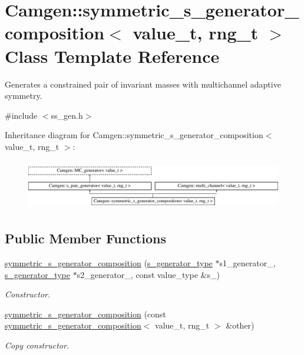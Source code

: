 \hypertarget{a00533}{}\section{Camgen\+:\+:symmetric\+\_\+s\+\_\+generator\+\_\+composition$<$ value\+\_\+t, rng\+\_\+t $>$ Class Template Reference}
\label{a00533}


Generates a constrained pair of invariant masses with multichannel adaptive symmetry.  




{\ttfamily \#include $<$ss\+\_\+gen.\+h$>$}

Inheritance diagram for Camgen\+:\+:symmetric\+\_\+s\+\_\+generator\+\_\+composition$<$ value\+\_\+t, rng\+\_\+t $>$\+:\begin{figure}[H]
\begin{center}
\leavevmode
\includegraphics[height=2.216359cm]{a00533}
\end{center}
\end{figure}
\subsection*{Public Member Functions}
\begin{DoxyCompactItemize}
\item 
\hypertarget{a00533_ab86ac42c4a72e297e248e5801c8919d5}{}\hyperlink{a00533_ab86ac42c4a72e297e248e5801c8919d5}{symmetric\+\_\+s\+\_\+generator\+\_\+composition} (\hyperlink{a00577}{s\+\_\+generator\+\_\+type} $\ast$s1\+\_\+generator\+\_\+, \hyperlink{a00577}{s\+\_\+generator\+\_\+type} $\ast$s2\+\_\+generator\+\_\+, const value\+\_\+type \&s\+\_\+)\label{a00533_ab86ac42c4a72e297e248e5801c8919d5}

\begin{DoxyCompactList}\small\item\em Constructor. \end{DoxyCompactList}\item 
\hypertarget{a00533_a9305a64564b0f6b4a496fd495301e0a4}{}\hyperlink{a00533_a9305a64564b0f6b4a496fd495301e0a4}{symmetric\+\_\+s\+\_\+generator\+\_\+composition} (const \hyperlink{a00533}{symmetric\+\_\+s\+\_\+generator\+\_\+composition}$<$ value\+\_\+t, rng\+\_\+t $>$ \&other)\label{a00533_a9305a64564b0f6b4a496fd495301e0a4}

\begin{DoxyCompactList}\small\item\em Copy constructor. \end{DoxyCompactList}\end{DoxyCompactItemize}
